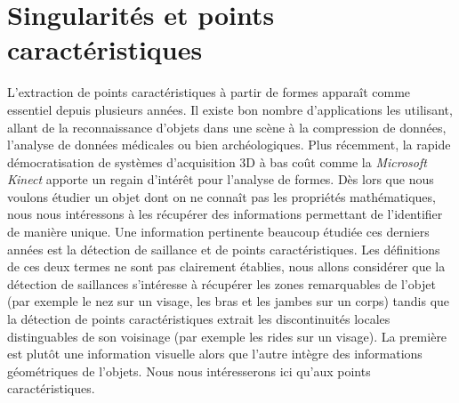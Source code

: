 \section{Singularités et points caractéristiques}%
\label{sec:applications:feature}
%
L'extraction de points caractéristiques à partir de formes apparaît comme
essentiel depuis plusieurs années. Il existe bon nombre d'applications les
utilisant, allant de la reconnaissance d'objets dans une scène à la compression
de données, l'analyse de données médicales ou bien archéologiques. Plus
récemment, la rapide démocratisation de systèmes d'acquisition 3D à bas coût
comme la \emph{Microsoft Kinect} apporte un regain d'intérêt pour l'analyse de
formes.
%
%
Dès lors que nous voulons étudier un objet dont on ne connaît pas les propriétés
mathématiques, nous nous intéressons à les récupérer des informations permettant
de l'identifier de manière unique. Une information pertinente beaucoup étudiée
ces derniers années est la détection de saillance et de points caractéristiques.
Les définitions de ces deux termes ne sont pas clairement établies, nous allons
considérer que la détection de saillances s'intéresse à récupérer les zones
remarquables de l'objet (par exemple le nez sur un visage, les bras et les
jambes sur un corps) tandis que la détection de points caractéristiques extrait
les discontinuités locales distinguables de son voisinage (par exemple les rides
sur un visage). La première est plutôt une information visuelle alors que
l'autre intègre des informations géométriques de l'objets. Nous nous
intéresserons ici qu'aux points caractéristiques.
%
%
